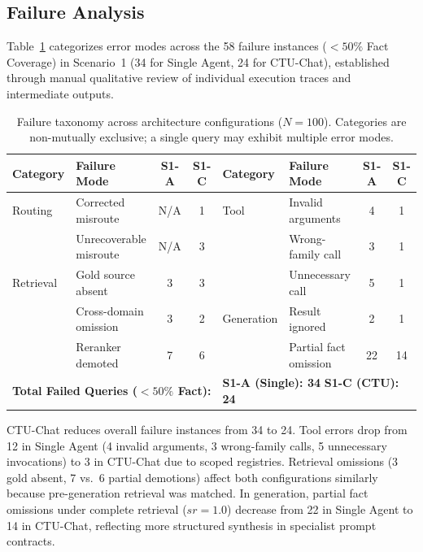 \subsection{Failure Analysis}
\label{sec:failure_analysis}

Table~\ref{tab:failures} categorizes error modes across the 58 failure instances ($<50\%$ Fact Coverage) in Scenario~1 (34 for Single Agent, 24 for CTU-Chat), established through manual qualitative review of individual execution traces and intermediate outputs.

\begin{table}[!htbp]
\centering
\caption{Failure taxonomy across architecture configurations ($N=100$). Categories are non-mutually exclusive; a single query may exhibit multiple error modes.}
\label{tab:failures}
{\footnotesize\setlength{\tabcolsep}{2.2pt}
\begin{tabular}{llcc|llcc}
\toprule
\textbf{Category} & \textbf{Failure Mode} & \textbf{S1-A} & \textbf{S1-C} & \textbf{Category} & \textbf{Failure Mode} & \textbf{S1-A} & \textbf{S1-C} \\
\midrule
Routing   & Corrected misroute     & N/A & 1 & Tool       & Invalid arguments     & 4 & 1 \\
          & Unrecoverable misroute & N/A & 3 &            & Wrong-family call     & 3 & 1 \\
Retrieval & Gold source absent     & 3   & 3 &            & Unnecessary call      & 5 & 1 \\
          & Cross-domain omission  & 3   & 2 & Generation & Result ignored        & 2 & 1 \\
          & Reranker demoted       & 7   & 6 &            & Partial fact omission & 22 & 14 \\
\midrule
\multicolumn{4}{l|}{\textbf{Total Failed Queries ($<50\%$ Fact):}} & \multicolumn{4}{l}{\textbf{S1-A (Single): 34} \qquad \textbf{S1-C (CTU): 24}} \\
\bottomrule
\end{tabular}}
\end{table}

CTU-Chat reduces overall failure instances from 34 to 24. Tool errors drop from 12 in Single Agent (4 invalid arguments, 3 wrong-family calls, 5 unnecessary invocations) to 3 in CTU-Chat due to scoped registries. Retrieval omissions (3 gold absent, 7 vs.\ 6 partial demotions) affect both configurations similarly because pre-generation retrieval was matched. In generation, partial fact omissions under complete retrieval ($sr=1.0$) decrease from 22 in Single Agent to 14 in CTU-Chat, reflecting more structured synthesis in specialist prompt contracts.

